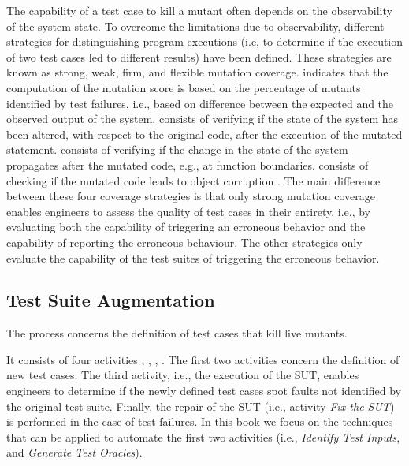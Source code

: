 The capability of a test case to kill a mutant often depends on the observability of the system state. 
To overcome the limitations due to observability, different strategies for distinguishing program executions (i.e, to determine if the execution of two test cases led to different results) have been defined. These strategies are known as strong, weak, firm, and flexible mutation coverage.
 indicates that the computation of the mutation score is based on the percentage of mutants identified by test failures, i.e., based on difference between the expected and the observed output of the system.  
 consists of verifying if the state of the system has been altered, with respect to the original code, after the execution of the mutated statement. 
 consists of verifying if the change in the state of the system propagates after the mutated code, e.g., at function boundaries. 
 consists of checking if the mutated code leads to object corruption \cite{mateo2012validating}. The main difference between these four coverage strategies is that only strong mutation coverage enables engineers to assess the quality of test cases in their entirety, i.e., by evaluating both the capability of triggering an erroneous behavior and the capability of reporting the erroneous behaviour. 
The other strategies only evaluate the capability of the test suites of triggering the erroneous behavior. 


\subsection{Test Suite Augmentation} %
\label{sub:test_suite_augmentation}

The  process concerns the definition of test cases that kill live mutants.


It consists of four activities , , , . The first two activities concern the definition of new test cases.
The third activity, i.e., the execution of the SUT, enables engineers to determine if the newly defined test cases spot faults not identified by the original test suite. 
Finally, the repair of the SUT (i.e., activity \emph{Fix the SUT}) is performed in the case of test failures.
In this book we focus on the techniques that can be applied to automate the first two activities (i.e., \emph{Identify Test Inputs}, and \emph{Generate Test Oracles}).
 
